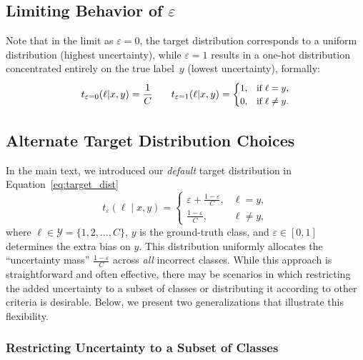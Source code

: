 \subsection{Limiting Behavior of $\varepsilon$}

Note that in the limit as \(\varepsilon = 0\), the target distribution corresponds to a uniform distribution (highest uncertainty), while \(\varepsilon = 1\) results in a one-hot distribution concentrated entirely on the true label~\(y\) (lowest uncertainty), formally: 
\begin{equation}
\small
    t_{\varepsilon = 0}(\ell|x, y) = \frac{1}{C} \qquad t_{\varepsilon = 1}(\ell|x, y) =
\begin{cases}
1, & \text{if } \ell = y, \\
0, & \text{if } \ell \neq y.
\end{cases}
\end{equation}

\subsection{Alternate Target Distribution Choices}
\label{app:target_distr}

In the main text, we introduced our \emph{default} target distribution in Equation~\ref{eq:target_dist}
\begin{equation}
  t_\varepsilon(\ell \mid x,y) =
  \begin{cases}
    \varepsilon + \frac{1-\varepsilon}{C}, & \ell = y, \\
    \frac{1-\varepsilon}{C}, & \ell \neq y,
  \end{cases}
\end{equation}
where \(\ell \in \mathcal{Y} = \{1,2,\dots,C\}\), \(y\) is the ground-truth class, and \(\varepsilon \in [0,1]\) determines the extra bias on \(y\). This distribution uniformly allocates the “uncertainty mass” \(\frac{1-\varepsilon}{C}\) across \emph{all} incorrect classes. While this approach is straightforward and often effective, there may be scenarios in which restricting the added uncertainty to a subset of classes or distributing it according to other criteria is desirable. Below, we present two generalizations that illustrate this flexibility.

\subsubsection{Restricting Uncertainty to a Subset of Classes}

